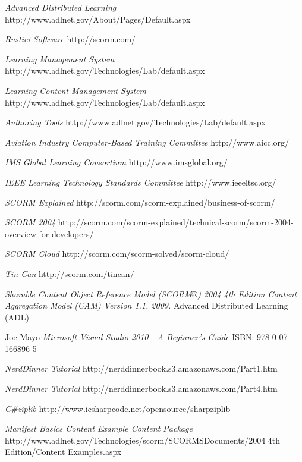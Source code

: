 \begin{thebibliography}{9}
		\emph{Advanced Distributed Learning}
		http://www.adlnet.gov/About/Pages/Default.aspx

		\emph{Rustici Software}
		http://scorm.com/

		\emph{Learning Management System}
		http://www.adlnet.gov/Technologies/Lab/default.aspx

		\emph{Learning Content Management System}
		http://www.adlnet.gov/Technologies/Lab/default.aspx

		\emph{Authoring Tools}
		http://www.adlnet.gov/Technologies/Lab/default.aspx

		\emph{Aviation Industry Computer-Based Training Committee}
		http://www.aicc.org/

		\emph{IMS Global Learning Consortium}
		http://www.imsglobal.org/

		\emph{IEEE Learning Technology Standards Committee}
		http://www.ieeeltsc.org/


		\emph{SCORM Explained}
		http://scorm.com/scorm-explained/business-of-scorm/

		\emph{SCORM 2004}
		http://scorm.com/scorm-explained/technical-scorm/scorm-2004-overview-for-developers/

		\emph{SCORM Cloud}
		http://scorm.com/scorm-solved/scorm-cloud/

		\emph{Tin Can}
		http://scorm.com/tincan/

		\emph{Sharable Content Object Reference Model (SCORM®) 2004 4th Edition Content Aggregation Model (CAM) Version 1.1, 2009.}
		Advanced Distributed Learning (ADL)

		Joe Mayo
		\emph{Microsoft Visual Studio 2010 - A Beginner's Guide}
		ISBN: 978-0-07-166896-5

		\emph{NerdDinner Tutorial}
		http://nerddinnerbook.s3.amazonaws.com/Part1.htm

		\emph{NerdDinner Tutorial}
		http://nerddinnerbook.s3.amazonaws.com/Part4.htm

		\emph{C\#ziplib}
		http://www.icsharpcode.net/opensource/sharpziplib

		\emph{Manifest Basics Content Example Content Package}
		http://www.adlnet.gov/Technologies/scorm/SCORMSDocuments/2004 4th Edition/Content Examples.aspx


\end{thebibliography}
